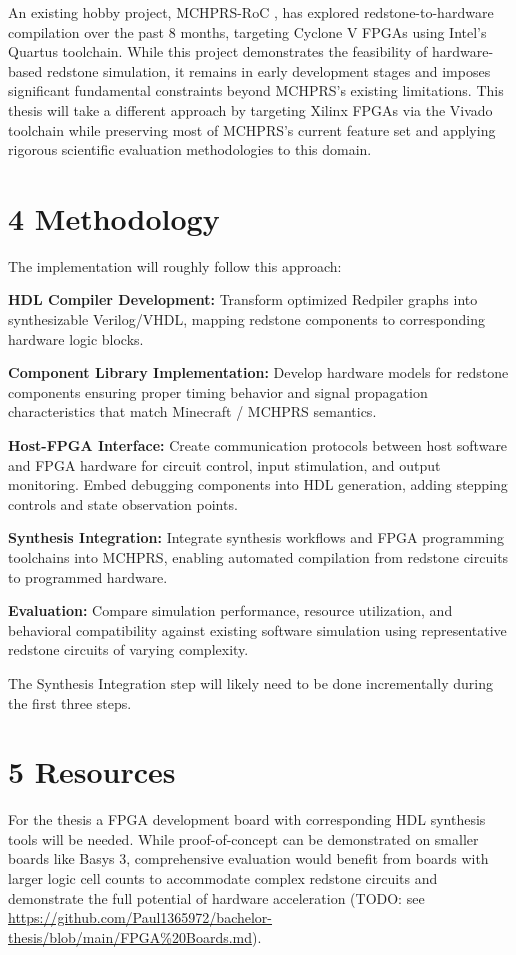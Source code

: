 \documentclass[a4paper,11pt]{article}
\begin{document}
An existing hobby project, MCHPRS-RoC \cite{mchprsroc}, has explored redstone-to-hardware compilation over the past 8 months, targeting Cyclone V FPGAs using Intel's Quartus toolchain.
While this project demonstrates the feasibility of hardware-based redstone simulation, it remains in early development stages and imposes significant fundamental constraints beyond MCHPRS's existing limitations.
This thesis will take a different approach by targeting Xilinx FPGAs via the Vivado toolchain while preserving most of MCHPRS's current feature set and applying rigorous scientific evaluation methodologies to this domain.

\section*{4 Methodology}

The implementation will roughly follow this approach:

\textbf{HDL Compiler Development:} Transform optimized Redpiler graphs into synthesizable Verilog/VHDL, mapping redstone components to corresponding hardware logic blocks.

\textbf{Component Library Implementation:} Develop hardware models for redstone components ensuring proper timing behavior and signal propagation characteristics that match Minecraft / MCHPRS semantics.

\textbf{Host-FPGA Interface:} Create communication protocols between host software and FPGA hardware for circuit control, input stimulation, and output monitoring.
Embed debugging components into HDL generation, adding stepping controls and state observation points.

\textbf{Synthesis Integration:} Integrate synthesis workflows and FPGA programming toolchains into MCHPRS, enabling automated compilation from redstone circuits to programmed hardware.

\textbf{Evaluation:} Compare simulation performance, resource utilization, and behavioral compatibility against existing software simulation using representative redstone circuits of varying complexity.

The Synthesis Integration step will likely need to be done incrementally during the first three steps.

\section*{5 Resources}

For the thesis a FPGA development board with corresponding HDL synthesis tools will be needed.
While proof-of-concept can be demonstrated on smaller boards like Basys 3, comprehensive evaluation would benefit from boards with larger logic cell counts to accommodate complex redstone circuits and demonstrate the full potential of hardware acceleration (TODO: see \url{https://github.com/Paul1365972/bachelor-thesis/blob/main/FPGA\%20Boards.md}).
\end{document}
